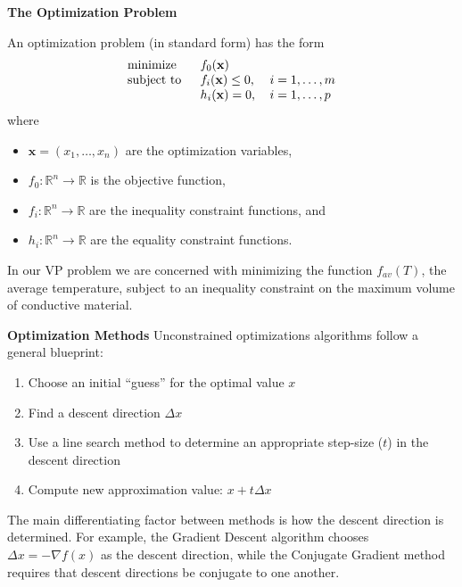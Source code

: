 \documentclass[final]{beamer}
\begin{document}
\begin{frame}{\textbf{The Optimization Problem}}
	\pause
	\begin{definition}
		An optimization problem (in standard form) has the form
		\begin{equation}
			\begin{tabular}{lll}
				\text{minimize }   & $f_0(\mathbf{x})$        &                 \\
				\text{subject to } & $f_i(\mathbf{x})\leq 0$, & $i=1,\ldots, m$ \\
				& $h_i(\mathbf{x}) = 0$,   & $i=1,\ldots, p$ 
			\end{tabular}\label{Optimization}
		\end{equation}
		where
		\begin{itemize}
			\item $\mathbf{x}=\left(x_1,\ldots,x_n\right)$ are the optimization variables,
			\item $f_0 : \mathbb{R}^n\rightarrow\mathbb{R}$ is the objective function,
			\item $f_i : \mathbb{R}^n\rightarrow\mathbb{R}$ are the inequality constraint functions, and
			\item $h_i : \mathbb{R}^n\rightarrow\mathbb{R}$ are the equality constraint functions.
		\end{itemize}
	\end{definition}
	\pause
	In our VP problem we are concerned with minimizing the function $f_{av}(T)$, the average temperature, subject to an inequality constraint on the maximum volume of conductive material.
\end{frame}

\begin{frame}{\textbf{Optimization Methods}}
	Unconstrained optimizations algorithms follow a general blueprint:\pause
	\begin{enumerate}
		\item Choose an initial ``guess'' for the optimal value $x$\pause
		\item Find a descent direction $\Delta x$\pause
		\item Use a line search method to determine an appropriate step-size ($t$) in the descent direction\pause
		\item Compute new approximation value: $x+t\Delta x$\pause
	\end{enumerate}
	\pause
	\vfill
	The main differentiating factor between methods is how the descent direction is determined.\pause
	\vfill
	For example, the Gradient Descent algorithm chooses $\Delta x=-\nabla f(x)$ as the descent direction, while the Conjugate Gradient method requires that descent directions be conjugate to one another.
\end{frame}
\end{document}

